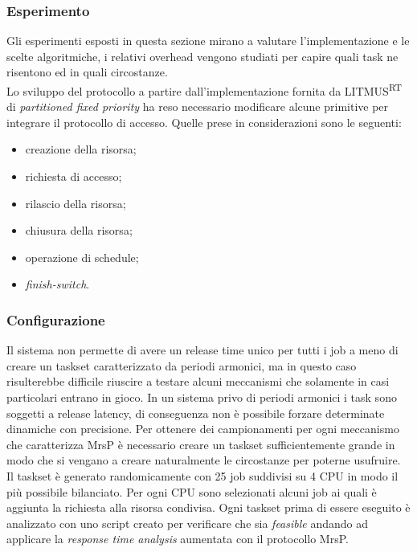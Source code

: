 \subsubsection{Esperimento}
\label{sec:overhead_exp}

\noindent Gli esperimenti esposti in questa sezione mirano a valutare l'implementazione e le scelte algoritmiche, i relativi overhead vengono studiati per capire quali task ne risentono ed in quali circostanze.\\

\noindent Lo sviluppo del protocollo a partire dall'implementazione fornita da LITMUS\textsuperscript{RT} di \textit{partitioned fixed priority} ha reso necessario modificare alcune primitive per integrare il protocollo di accesso. Quelle prese in considerazioni sono le seguenti:

\begin{itemize}
	\item creazione della risorsa;
	\item richiesta di accesso;
	\item rilascio della risorsa;
	\item chiusura della risorsa;
	\item operazione di schedule;
	\item \textit{finish-switch}.
\end{itemize}

\subsubsection{Configurazione}
\label{sec:overhead_conf}

\noindent Il sistema non permette di avere un release time unico per tutti i job a meno di creare un taskset caratterizzato da periodi armonici, ma in questo caso risulterebbe difficile riuscire a testare alcuni meccanismi che solamente in casi particolari entrano in gioco. In un sistema privo di periodi armonici i task sono soggetti a release latency, di conseguenza non è possibile forzare determinate dinamiche con precisione. Per ottenere dei campionamenti per ogni meccanismo che caratterizza MrsP è necessario creare un taskset sufficientemente grande in modo che si vengano a creare naturalmente le circostanze per poterne usufruire.\\
\noindent Il taskset è generato randomicamente con 25 job suddivisi su 4 CPU in modo il più possibile bilanciato. Per ogni CPU sono selezionati alcuni job ai quali è aggiunta la richiesta alla risorsa condivisa. Ogni taskset prima di essere eseguito è analizzato con uno script creato per verificare che sia \textit{feasible} andando ad applicare la \textit{response time analysis} aumentata con il protocollo MrsP.\\

